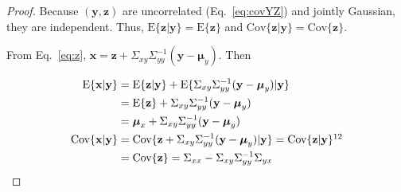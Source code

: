 \begin{proof}
    Because $(\mathbf{y},\mathbf{z})$ are uncorrelated (Eq.~\ref{eq:covYZ}) and
    jointly Gaussian, they are independent. Thus,
    $\text{E}\{\mathbf{z}|\mathbf{y}\}=\text{E}\{\mathbf{z}\}$ and
    $\text{Cov}\{\mathbf{z}|\mathbf{y}\}=\text{Cov}\{\mathbf{z}\}$.

    From Eq.~\ref{eq:z},
    $\mathbf{x}=\mathbf{z}+\Sigma_{xy}\Sigma_{yy}^{-1}(\mathbf{y}-\boldsymbol{\mu}_y)$.
    Then

    \begin{align}
        \text{E}\{\mathbf{x}|\mathbf{y}\}&=\text{E}\{\mathbf{z}|\mathbf{y}\}+\text{E}\{\Sigma_{xy}\Sigma_{yy}^{-1}(\mathbf{y}-\boldsymbol{\mu}_y)|\mathbf{y}\}\nonumber\\
                                         &=\text{E}\{\mathbf{z}\}+\Sigma_{xy}\Sigma_{yy}^{-1}(\mathbf{y}-\boldsymbol{\mu}_y)\nonumber\\
                                         &=\boldsymbol{\mu}_x+\Sigma_{xy}\Sigma_{yy}^{-1}(\mathbf{y}-\boldsymbol{\mu}_y)\nonumber\\
        \text{Cov}\{\mathbf{x}|\mathbf{y}\}&=\text{Cov}\{\mathbf{z}+\Sigma_{xy}\Sigma_{yy}^{-1}(\mathbf{y}-\boldsymbol{\mu}_y)|\mathbf{y}\}=\text{Cov}\{\mathbf{z}|\mathbf{y}\}\footnotemark[12]\\
                                           &=\text{Cov}\{\mathbf{z}\}=\Sigma_{xx}-\Sigma_{xy}\Sigma_{yy}^{-1}\Sigma_{yx}\nonumber
    \end{align}
\end{proof}
